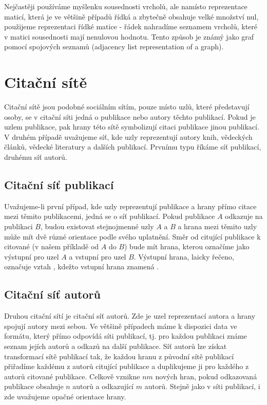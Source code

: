\documentclass{bakalarka}
\begin{document}
Nejčastěji používáme myšlenku sousednosti vrcholů, ale namísto reprezentace
maticí, která je ve většině případů řídká a zbytečně obsahuje velké množství
nul, použijeme reprezentaci řídké matice - řádek nahradíme seznamem vrcholů,
které v matici sousednosti mají nenulovou hodnotu. Tento způsob je známý jako
graf pomocí spojových seznamů (adjacency list representation of a graph).


\section{Citační sítě}
Citační sítě jsou podobné sociálním sítím, pouze místo uzlů, které představují
osoby, se v citační síti jedná o publikace nebo autory těchto publikací. Pokud
je uzlem publikace, pak hrany této sítě symbolizují citaci publikace jinou
publikací. V druhém případě uvažujeme síť, kde uzly reprezentují autory knih,
vědeckých článků, vědecké literatury a dalších publikací. Prvnímu typu říkáme
síť publikací, druhému síť autorů.

\subsection{Citační síť publikací}
Uvažujeme-li první případ, kde uzly reprezentují publikace a hrany přímo citace
mezi těmito publikacemi, jedná se o síť publikací. Pokud publikace $A$ odkazuje
na publikaci $B$, budou existovat stejnojmenné uzly $A$ a $B$ a hrana mezi
těmito uzly může mít dvě různé orientace podle svého uplatnění. Směr od
citující publikace k citované (v našem příkladě od $A$ do $B$) bude mít hrana,
kterou označíme jako výstupní pro uzel $A$ a vstupní pro uzel $B$.  Výstupní
hrana, laicky řečeno, označuje vztah , kdežto vstupní hrana znamená
.

\subsection{Citační síť autorů}
Druhou citační sítí je citační síť autorů. Zde je uzel reprezentací autora a
hrany spojují autory mezi sebou. Ve většině případech máme k dispozici data ve
formátu, který přímo odpovídá síti publikací, tj. pro každou publikaci známe
seznam jejích autorů a odkazů na další publikace. Síť autorů lze získat
transformací sítě publikací tak, že každou hranu z původní sítě publikací
přiřadíme každému z autorů citující publikace a duplikujeme ji pro každého z
autorů citované publikace. Celkově vznikne $nm$ nových hran, pokud odkazovaná
publikace obsahuje $n$ autorů a odkazující $m$ autorů. Stejně jako v síti
publikací, i zde uvažujeme opačné orientace hrany.
\end{document}
